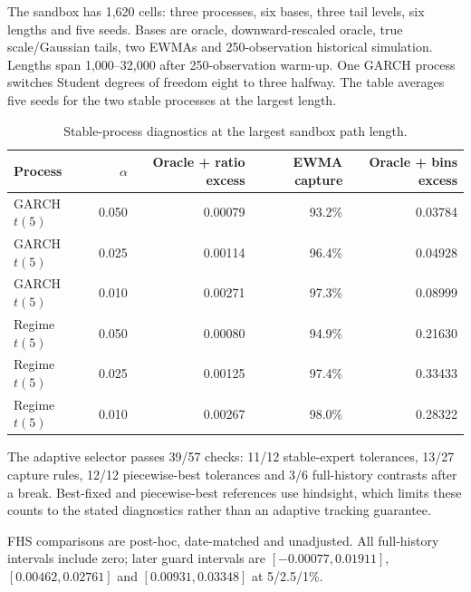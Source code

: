 The sandbox has 1,620 cells: three processes, six bases, three tail levels, six lengths and five seeds. Bases are oracle, downward-rescaled oracle, true scale/Gaussian tails, two EWMAs and 250-observation historical simulation. Lengths span 1,000--32,000 after 250-observation warm-up. One GARCH process switches Student degrees of freedom eight to three halfway. The table averages five seeds for the two stable processes at the largest length.

\begin{table}[htbp]
\centering
\caption[Stable-process diagnostics]{Stable-process diagnostics at the largest sandbox path length.}
\label{tab:tail-sandbox-audit}
\small
\begin{tabular}{lrrrr}
\toprule
Process & $\alpha$ & Oracle + ratio excess & EWMA capture & Oracle + bins excess\\
\midrule
GARCH $t(5)$ & 0.050 & 0.00079 & 93.2\% & 0.03784\\
GARCH $t(5)$ & 0.025 & 0.00114 & 96.4\% & 0.04928\\
GARCH $t(5)$ & 0.010 & 0.00271 & 97.3\% & 0.08999\\
Regime $t(5)$ & 0.050 & 0.00080 & 94.9\% & 0.21630\\
Regime $t(5)$ & 0.025 & 0.00125 & 97.4\% & 0.33433\\
Regime $t(5)$ & 0.010 & 0.00267 & 98.0\% & 0.28322\\
\bottomrule
\end{tabular}
\end{table}

The adaptive selector passes 39/57 checks: 11/12 stable-expert tolerances, 13/27 capture rules, 12/12 piecewise-best tolerances and 3/6 full-history contrasts after a break. Best-fixed and piecewise-best references use hindsight, which limits these counts to the stated diagnostics rather than an adaptive tracking guarantee.

FHS comparisons are post-hoc, date-matched and unadjusted. All full-history intervals include zero; later guard intervals are $[-0.00077,0.01911]$, $[0.00462,0.02761]$ and $[0.00931,0.03348]$ at 5/2.5/1\%.

